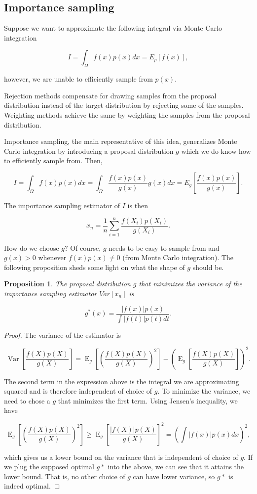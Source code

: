 \documentclass{book}
\theoremstyle{plain}%
\newtheorem{proposition}{Proposition}[section]
\theoremstyle{definition}
\DeclareMathOperator{\Var}{Var}
\DeclareMathOperator{\E}{E}
\begin{document}
\subsection*{Importance sampling}

Suppose we want to approximate the following integral via Monte Carlo integration

$$I = \int_\Omega f(x) p(x) dx = E_p[f(x)],$$

however, we are unable to efficiently sample from $p(x)$.

Rejection methods compensate for drawing samples from the proposal distribution instead of the target distribution by rejecting some of the samples. Weighting methods achieve the same by weighting the samples from the proposal distribution.

Importance sampling, the main representative of this idea, generalizes Monte Carlo integration by introducing a proposal distribution $g$ which we do know how to efficiently sample from. Then,

$$I = \int_\Omega f(x) p(x) dx = \int_\Omega \frac{f(x) p(x)}{g(x)} g(x) dx = E_g[\frac{f(x) p(x)}{g(x)}].$$

The importance sampling estimator of $I$ is then

$$x_n = \frac{1}{n}\sum_{i=1}^n \frac{f(X_i) p(X_i)}{g(X_i)}.$$

How do we choose $g$? Of course, $g$ needs to be easy to sample from and $g(x) > 0$ whenever $f(x)p(x) \neq 0$ (from Monte Carlo integration). The following proposition sheds some light on what the shape of $g$ should be.

\begin{proposition} The proposal distribution $g$ that minimizes the variance of the importance sampling estimator $Var[x_n]$ is

$$g^*(x) = \frac{|f(x)|p(x)}{\int |f(t)|p(t)dt}.$$
\end{proposition}

\begin{proof} The variance of the estimator is

$$\Var[\frac{f(X)p(X)}{g(X)}] = \E_g[(\frac{f(X)p(X)}{g(X)})^2] - (\E_g[\frac{f(X)p(X)}{g(X)}])^2.$$

The second term in the expression above is the integral we are approximating squared and is therefore independent of choice of $g$. To minimize the variance, we need to chose a $g$ that minimizes the first term. Using Jensen's inequality, we have

$$\E_g\left[(\frac{f(X)p(X)}{g(X)})^2\right] \geq \E_g\left[\frac{|f(X)|p(X)}{g(X)}\right]^2 = \left(\int |f(x)|p(x)dx\right)^2,$$

which gives us a lower bound on the variance that is independent of choice of $g$. If we plug the supposed optimal $g*$ into the above, we can see that it attains the lower bound. That is, no other choice of $g$ can have lower variance, so $g*$ is indeed optimal.

\end{proof}
\end{document}
